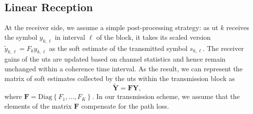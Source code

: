 \documentclass[12pt,draftclsnofoot,onecolumn,journal]{IEEEtran}
\newcommand{\cmt}[1]{\textcolor{red}{#1} }
\newcommand{\Diag}[1]{ \mathrm{Diag}\left\lbrace #1 \right\rbrace }
\begin{document}

\subsection{Linear Reception}
At the receiver side, we assume a simple post-processing strategy: as \ac{ut} $k$ receives the symbol $y_{k,\ell}$ in interval $\ell$ of the block, it takes its scaled version $\tilde{y}_{k,\ell} = F_k y_{k,\ell}$ as the soft estimate of the transmitted symbol $s_{k,\ell}$. The receiver gains of the \acp{ut} are updated based on channel statistics and hence remain unchanged within a coherence time interval. As the result, we can represent the matrix of soft estimates collected by the \acp{ut} within the transmission block as
\begin{equation}
	\tilde{\mathbf Y}=\mathbf F \mathbf Y, %
\end{equation}
where $\mathbf{F} = \Diag{ F_1, \ldots, F_K }$. In our transmission scheme, we assume that the elements of the matrix $\mathbf F$ compensate for the path loss.%


\end{document}
